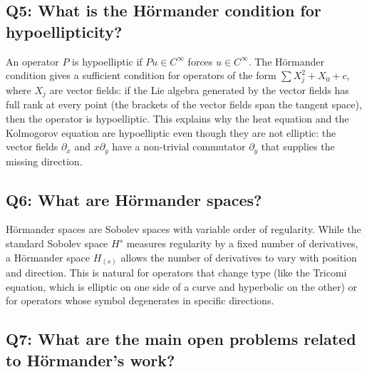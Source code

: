 \subsection*{Q5: What is the H\"ormander condition for
hypoellipticity?}

An operator \(P\) is hypoelliptic if \(Pu \in C^\infty\) forces
\(u \in C^\infty\). The H\"ormander condition gives a sufficient
condition for operators of the form \(\sum X_j^2 + X_0 + c\), where
\(X_j\) are vector fields: if the Lie algebra generated by the vector
fields has full rank at every point (the brackets of the vector fields
span the tangent space), then the operator is hypoelliptic. This
explains why the heat equation and the Kolmogorov equation are
hypoelliptic even though they are not elliptic: the vector fields
\(\partial_x\) and \(x\partial_y\) have a non-trivial commutator
\(\partial_y\) that supplies the missing direction.

\subsection*{Q6: What are H\"ormander spaces?}

H\"ormander spaces are Sobolev spaces with variable order of
regularity. While the standard Sobolev space \(H^s\) measures
regularity by a fixed number of derivatives, a H\"ormander space
\(H_{(s)}\) allows the number of derivatives to vary with position and
direction. This is natural for operators that change type (like the
Tricomi equation, which is elliptic on one side of a curve and
hyperbolic on the other) or for operators whose symbol degenerates in
specific directions.

\subsection*{Q7: What are the main open problems related to
H\"ormander's work?}

